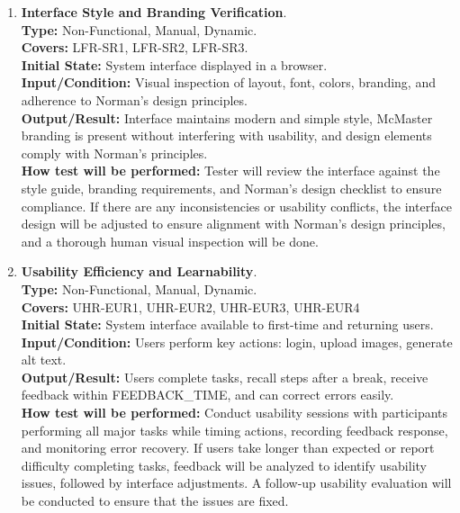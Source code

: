 \documentclass[12pt, titlepage]{article}
\begin{document}
\begin{enumerate}[label=NFR-ST \arabic*., wide=0pt, leftmargin=*]
  \item \textbf{Interface Style and Branding Verification}. \\[2mm]
    \textbf{Type:} Non-Functional, Manual, Dynamic. \\
    \textbf{Covers:} LFR-SR1, LFR-SR2, LFR-SR3. \\
    \textbf{Initial State:} System interface displayed in a browser. \\
    \textbf{Input/Condition:} Visual inspection of layout, font,
    colors, branding, and adherence to Norman's design principles. \\
    \textbf{Output/Result:} Interface maintains modern and simple
    style, McMaster branding is present without interfering with
    usability, and design elements comply with Norman’s principles. \\[2mm]
    \textbf{How test will be performed:} Tester will review the
    interface against the style guide, branding requirements, and
    Norman’s design checklist to ensure compliance. If there are any inconsistencies or usability conflicts,
    the interface design will be adjusted to ensure alignment with Norman’s design principles, and a thorough
    human visual inspection will be done.

  \item \textbf{Usability Efficiency and Learnability}. \\[2mm]
    \textbf{Type:} Non-Functional, Manual, Dynamic. \\
    \textbf{Covers:} UHR-EUR1, UHR-EUR2, UHR-EUR3, UHR-EUR4 \\
    \textbf{Initial State:} System interface available to first-time
    and returning users. \\
    \textbf{Input/Condition:} Users perform key actions: login,
    upload images, generate alt text. \\
    \textbf{Output/Result:} Users complete tasks, recall
    steps after a break, receive feedback within FEEDBACK\_TIME, and can
    correct errors easily. \\[2mm]
    \textbf{How test will be performed:} Conduct usability sessions
    with participants performing all major tasks while timing
    actions, recording feedback response, and monitoring error recovery.
    If users take longer than expected or report difficulty completing tasks, 
    feedback will be analyzed to identify usability issues, followed by interface 
    adjustments. A follow-up usability evaluation will be conducted
    to ensure that the issues are fixed.


\end{enumerate}
\end{document}

